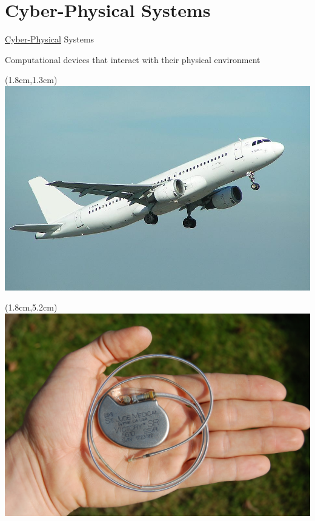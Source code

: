 \documentclass[aspectratio=169]{beamer}
\begin{document}
\frame[plain]{\titlepage}




\section{Cyber-Physical Systems}

\begin{frame}{\underline{Cyber-Physical} Systems}

\begin{center}
  \small{\alert{Computational} devices that interact with their \alert{physical} environment}
\end{center}
  
\begin{textblock*}{5cm}(1.8cm,1.3cm)
\includegraphics[scale=0.205]{Images/aviao.jpg} 
\end{textblock*}

\begin{textblock*}{5cm}(1.8cm,5.2cm)
\includegraphics[scale=0.2]{Images/pace.jpg} 
\end{textblock*}


\end{frame}
\end{document}
